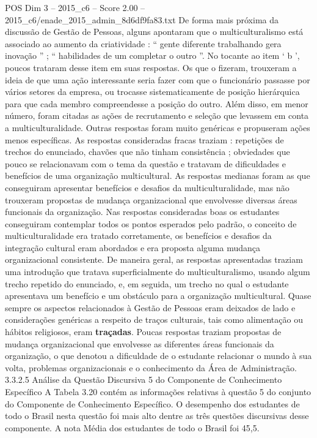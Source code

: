 \begin{textsample}{POS Dim 3 – 2015\_c6 – Score 2.00 – 2015\_c6/enade\_2015\_admin\_8d6df9fa83.txt}
De forma mais próxima da discussão de Gestão de Pessoas, alguns apontaram que o multiculturalismo está associado ao aumento da criatividade : “ gente diferente trabalhando gera inovação ” ; “ habilidades de um completar o outro ”.
No tocante ao item ‘ b ’, poucos trataram desse item em suas respostas.
Os que o fizeram, trouxeram a ideia de que uma ação interessante seria fazer com que o funcionário passasse por vários setores da empresa, ou trocasse sistematicamente de posição hierárquica para que cada membro compreendesse a posição do outro.
Além disso, em menor número, foram citadas as ações de recrutamento e seleção que levassem em conta a multiculturalidade.
Outras respostas foram muito genéricas e propuseram ações menos específicas.
As respostas consideradas fracas traziam : repetições de trechos do enunciado, chavões que não tinham consistência ; obviedades que pouco se relacionavam com o tema da questão e tratavam de dificuldades e benefícios de uma organização multicultural.
As respostas medianas foram as que conseguiram apresentar benefícios e desafios da multiculturalidade, mas não trouxeram propostas de mudança organizacional que envolvesse diversas áreas funcionais da organização.
Nas respostas consideradas boas os estudantes conseguiram contemplar todos os pontos esperados pelo padrão, o conceito de multiculturalidade era tratado corretamente, os benefícios e desafios da integração cultural eram abordados e era proposta alguma mudança organizacional consistente.
De maneira geral, as respostas apresentadas traziam uma introdução que tratava superficialmente do multiculturalismo, usando algum trecho repetido do enunciado, e, em seguida, um trecho no qual o estudante apresentava um benefício e um obstáculo para a organização multicultural.
Quase sempre os aspectos relacionados à Gestão de Pessoas eram deixados de lado e considerações genéricas a respeito de traços culturais, tais como alimentação ou hábitos religiosos, eram \textbf{traçadas}.
Poucas respostas traziam propostas de mudança organizacional que envolvesse as diferentes áreas funcionais da organização, o que denotou a dificuldade de o estudante relacionar o mundo à sua volta, problemas organizacionais e o conhecimento da Área de Administração. 3.3.2.5 Análise da Questão Discursiva 5 do Componente de Conhecimento Específico A Tabela 3.20 contém as informações relativas à questão 5 do conjunto do Componente de Conhecimento Específico.
O desempenho dos estudantes de todo o Brasil nesta questão foi mais alto dentre as três questões discursivas desse componente.
A nota Média dos estudantes de todo o Brasil foi 45,5.

\end{textsample}
